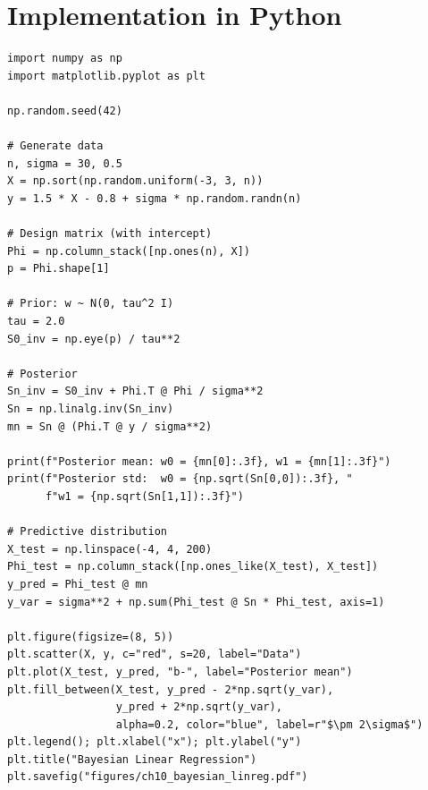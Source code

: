 \section{Implementation in Python}

\begin{codeblock}[title=\textbf{Bayesian Linear Regression}]
\begin{verbatim}
import numpy as np
import matplotlib.pyplot as plt

np.random.seed(42)

# Generate data
n, sigma = 30, 0.5
X = np.sort(np.random.uniform(-3, 3, n))
y = 1.5 * X - 0.8 + sigma * np.random.randn(n)

# Design matrix (with intercept)
Phi = np.column_stack([np.ones(n), X])
p = Phi.shape[1]

# Prior: w ~ N(0, tau^2 I)
tau = 2.0
S0_inv = np.eye(p) / tau**2

# Posterior
Sn_inv = S0_inv + Phi.T @ Phi / sigma**2
Sn = np.linalg.inv(Sn_inv)
mn = Sn @ (Phi.T @ y / sigma**2)

print(f"Posterior mean: w0 = {mn[0]:.3f}, w1 = {mn[1]:.3f}")
print(f"Posterior std:  w0 = {np.sqrt(Sn[0,0]):.3f}, "
      f"w1 = {np.sqrt(Sn[1,1]):.3f}")

# Predictive distribution
X_test = np.linspace(-4, 4, 200)
Phi_test = np.column_stack([np.ones_like(X_test), X_test])
y_pred = Phi_test @ mn
y_var = sigma**2 + np.sum(Phi_test @ Sn * Phi_test, axis=1)

plt.figure(figsize=(8, 5))
plt.scatter(X, y, c="red", s=20, label="Data")
plt.plot(X_test, y_pred, "b-", label="Posterior mean")
plt.fill_between(X_test, y_pred - 2*np.sqrt(y_var),
                 y_pred + 2*np.sqrt(y_var),
                 alpha=0.2, color="blue", label=r"$\pm 2\sigma$")
plt.legend(); plt.xlabel("x"); plt.ylabel("y")
plt.title("Bayesian Linear Regression")
plt.savefig("figures/ch10_bayesian_linreg.pdf")
\end{verbatim}
\end{codeblock}

